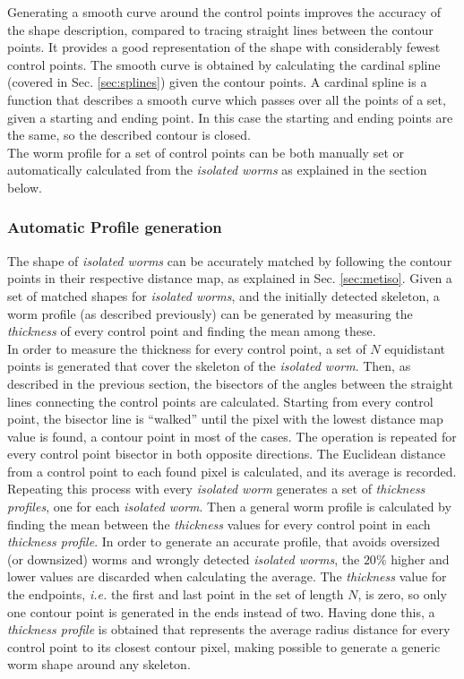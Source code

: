 Generating a smooth curve around the control points improves the accuracy of the shape
description, compared to tracing straight lines
between the contour points. It provides a good representation
of the shape with considerably fewest control points. The smooth curve
is obtained by calculating the cardinal spline (covered in Sec. \ref{sec:splines}) given the
contour points. A cardinal spline is a function that describes a smooth curve
which passes over all the points of a set, given a starting and ending point. 
In this case
the starting and ending points are the same, so the described contour is closed.\\

The worm profile for a set of control points can be both manually set or automatically
calculated from the \emph{isolated worms} as explained in the section below.

\subsubsection{Automatic Profile generation}
\label{sec:metwormprof}

The shape of \emph{isolated worms}  can be accurately matched
by following the contour points in their respective distance map, as explained 
in Sec. \ref{sec:metiso}. Given a set of matched shapes for \emph{isolated worms}, and
the initially detected skeleton, a worm profile (as described previously) can be 
generated by measuring the \emph{thickness} of every control point and finding the mean
among these.\\

In order to measure the thickness for every control point, a set of
$N$ equidistant points is generated that cover the skeleton of the \emph{isolated worm}.
Then, as described in the previous section, the bisectors of the angles between the 
straight lines connecting the control points are calculated. Starting from every control
point, the bisector line is ``walked'' until the pixel with the lowest distance map
value is found, a contour point in most of the cases. The operation is repeated for every 
control point bisector in both opposite directions. The Euclidean distance from a control
point to each found pixel is calculated, and its average is recorded. Repeating this process
with every \emph{isolated worm} generates a set of \emph{thickness profiles}, one for each
\emph{isolated worm}. Then a general worm profile is calculated by finding the mean between
the \emph{thickness} values for every control point in each \emph{thickness profile}. In order 
to generate an accurate profile, that avoids oversized (or downsized) worms and wrongly
detected \emph{isolated worms}, the $20\%$ higher and lower values are discarded when 
calculating the average. The \emph{thickness} value for
the endpoints, \emph{i.e.} the first and last point in the set of length $N$, is zero,
so only one contour point is generated in the ends instead of two.
Having done this, a \emph{thickness profile} is obtained that represents the average 
radius distance for every control point to its closest contour pixel, making possible
to generate a generic worm shape around any skeleton. 

